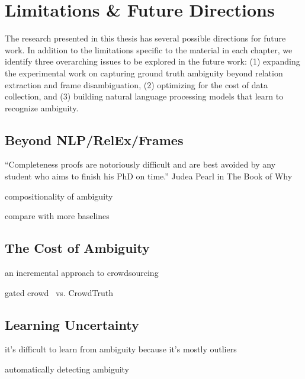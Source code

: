 \section{Limitations \& Future Directions}

The research presented in this thesis has several possible directions for future work. In addition to the limitations specific to the material in each chapter, we identify three overarching issues to be explored in the future work: (1) expanding the experimental work on capturing ground truth ambiguity beyond relation extraction and frame disambiguation, (2) optimizing for the cost of data collection, and (3) building natural language processing models that learn to recognize ambiguity.

\subsection{Beyond NLP/RelEx/Frames}

``Completeness proofs are notoriously difficult and are best avoided by any student who aims to finish his PhD on time.'' Judea Pearl in The Book of Why

compositionality of ambiguity

compare with more baselines


\subsection{The Cost of Ambiguity}

an incremental approach to crowdsourcing

gated crowd~\cite{liu2016effective} vs. CrowdTruth


\subsection{Learning Uncertainty}

it's difficult to learn from ambiguity because it's mostly outliers

automatically detecting ambiguity~\cite{lebanoff2018automatic}
